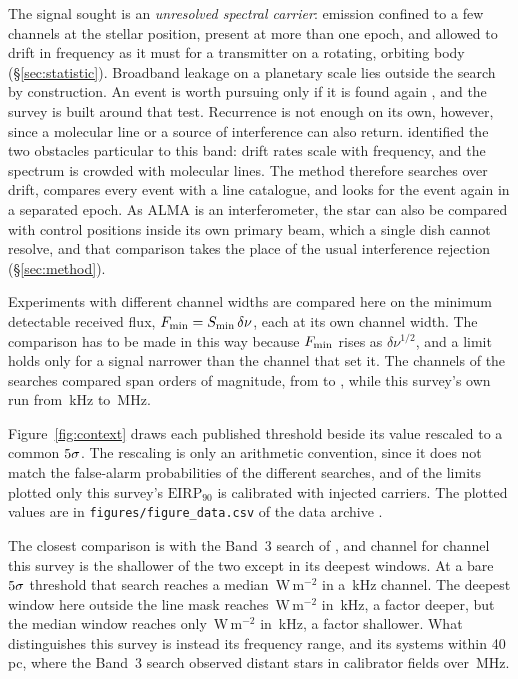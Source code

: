 The signal sought is an \emph{unresolved spectral carrier}: emission confined
to a few channels at the stellar position, present at more than one epoch,
and allowed to drift in frequency as it must for a transmitter on a rotating,
orbiting body (\S\ref{sec:statistic}). Broadband leakage on a planetary scale
\citep{BRaTs2026} lies outside the search by construction. An event is worth
pursuing only if it is found again \citep{Sheikh2021}, and the survey is
built around that test. Recurrence is not enough on its own, however, since
a molecular line or a source of interference can also return. \citet{Mason2025} identified the two
obstacles particular to this band: drift rates scale with frequency, and the
spectrum is crowded with molecular lines. The method therefore searches over
drift, compares every event with a line catalogue, and looks for the event
again in a separated epoch. As ALMA is an interferometer, the star can
also be compared with control positions inside its own primary beam, which a
single dish cannot resolve, and that comparison takes the place of the usual
interference rejection (\S\ref{sec:method}).

Experiments with different channel widths are compared here on the minimum
detectable received flux, $F_{\rm min}=S_{\rm min}\,\delta\nu$, each at its
own channel width. The comparison has to be made in this way because
$F_{\rm min}$ rises as $\delta\nu^{1/2}$, and a limit holds only for a signal
narrower than the channel that set it. The channels of the searches compared
span \LtChanSpanDex{} orders of magnitude, from \LtChanNarrow{} to
\LtChanWide, while this survey's own run from \SzChanFinestKHz\,kHz to
\SzChanWidestMHz\,MHz.

Figure~\ref{fig:context} draws each published threshold beside its value
rescaled to a common $5\sigma$. The rescaling is only an
arithmetic convention, since it does not match the false-alarm
probabilities of the different searches, and of the limits plotted only this
survey's $\mathrm{EIRP}_{90}$ is calibrated with injected carriers. The
plotted values are in \texttt{figures/figure\_data.csv} of the data archive
\citep{SIdeposit}.

The closest comparison is with the Band~3 search of \citet{Mason2025}, and
channel for channel this survey is the shallower of the two except in its
deepest windows. At a bare $5\sigma$ threshold that search reaches
a median \MasonFluxMed\,W\,m$^{-2}$ in a \MasonChanKHz\,kHz channel. The
deepest window here outside the line mask reaches \FluxTrigBest\,W\,m$^{-2}$
in \FluxChanBestKHz\,kHz, a factor \FluxNatBestRatio{} deeper, but the median
window reaches only \FluxTrigMed\,W\,m$^{-2}$ in \FluxChanMedKHz\,kHz, a
factor \FluxNatMedRatio{} shallower. What distinguishes this survey is
instead its frequency range, and its \NSysClassA{} systems within 40\,pc,
where the Band~3 search observed distant stars in \MasonNCal{} calibrator
fields over \MasonBandMHz\,MHz.
